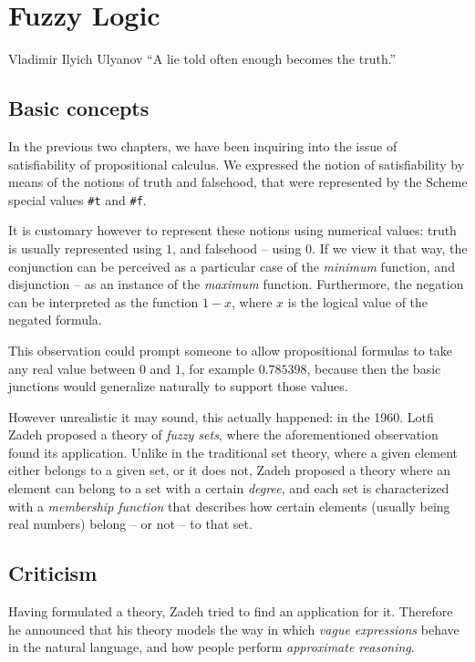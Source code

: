 \chapter{Fuzzy Logic}

\begin{chapquote}{Vladimir Ilyich Ulyanov}
``A lie told often enough becomes the truth.''
\end{chapquote}


\section{Basic concepts}

In the previous two chapters, we have been inquiring into
the issue of satisfiability of propositional calculus.
We expressed the notion of satisfiability by means of the
notions of truth and falsehood, that were represented
by the Scheme special values \texttt{\#t} and \texttt{\#f}.

It is customary however to represent these notions using
numerical values: truth is usually represented using $1$,
and falsehood -- using $0$. If we view it that way, the
conjunction can be perceived as a particular case of the
\textit{minimum} function, and disjunction -- as an
instance of the \textit{maximum} function. Furthermore,
the negation can be interpreted as the function $1-x$, where
$x$ is the logical value of the negated formula.

This observation could prompt someone to allow propositional
formulas to take any real value between $0$ and $1$, for
example $0.785398$, because then the basic junctions would
generalize naturally to support those values.

However unrealistic it may sound, this actually happened:
in the 1960. Lotfi Zadeh proposed a theory of \textit{fuzzy
sets}, where the aforementioned observation found its
application. Unlike in the traditional set theory, where
a given element either belongs to a given set, or it does
not, Zadeh proposed a theory where an element can belong
to a set with a certain \textit{degree}, and each set
is characterized with a \textit{membership function}
that describes how certain elements (usually being real
numbers) belong -- or not -- to that set.

\section{Criticism}

Having formulated a theory, Zadeh tried to find an application
for it. Therefore he announced that his theory models the way
in which \textit{vague expressions} behave in the natural
language, and how people perform \textit{approximate reasoning}.

